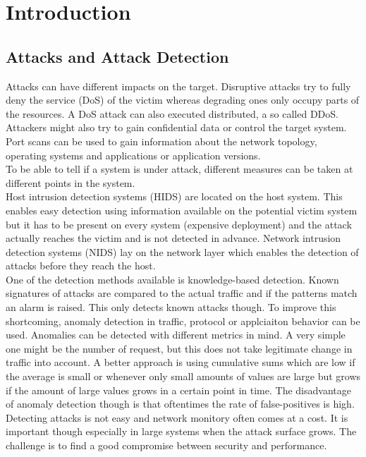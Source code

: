 
\section{Introduction}

\subsection{Attacks and Attack Detection}
Attacks can have different impacts on the target.
Disruptive attacks try to fully deny the service (DoS) of the victim whereas degrading ones only occupy parts of the resources.
A DoS attack can also executed distributed, a so called DDoS.
Attackers might also try to gain confidential data or control the target system.
Port scans can be used to gain information about the network topology, operating systems and applications or application versions.\\

To be able to tell if a system is under attack, different measures can be taken at different points in the system.\\
Host intrusion detection systems (HIDS) are located on the host system.
This enables easy detection using information available on the potential victim system but it has to be present on every system (expensive deployment) and the attack actually reaches the victim and is not detected in advance.
Network intrusion detection systems (NIDS) lay on the network layer which enables the detection of attacks before they reach the host.\\
One of the detection methods available is knowledge-based detection.
Known signatures of attacks are compared to the actual traffic and if the patterns match an alarm is raised.
This only detects known attacks though.
To improve this shortcoming, anomaly detection in traffic, protocol or applciaiton behavior can be used.
Anomalies can be detected with different metrics in mind.
A very simple one might be the number of request, but this does not take legitimate change in traffic into account.
A better approach is using cumulative sums which are low if the average is small or whenever only small amounts of values are large but grows if the amount of large values grows in a certain point in time.
The disadvantage of anomaly detection though is that oftentimes the rate of false-positives is high.\\
Detecting attacks is not easy and network monitory often comes at a cost.
It is important though especially in large systems when the attack surface grows.
The challenge is to find a good compromise between security and performance.

